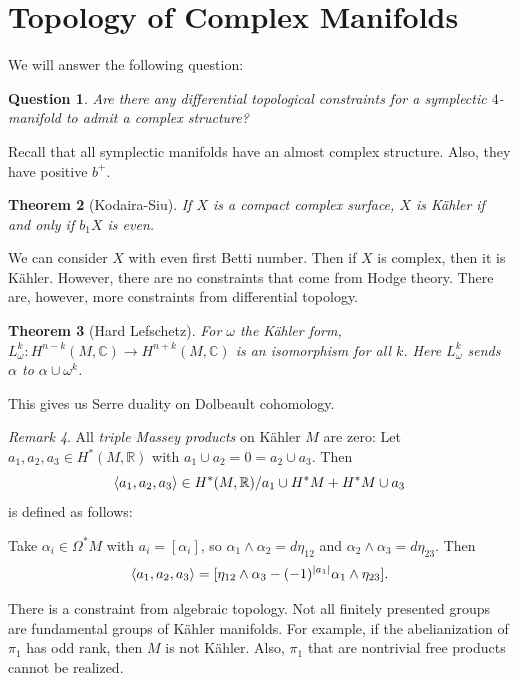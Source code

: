 \documentclass[leqno, openany]{memoir}
\DeclarePairedDelimiter{\gen}{\langle}{\rangle}
\newtheorem{thm}{Theorem}[chapter]
\newtheorem{quest}[thm]{Question}
\theoremstyle{definition}
\theoremstyle{remark}
\newtheorem{rmk}[thm]{Remark}
\theoremstyle{plain}
\theoremstyle{definition}
\theoremstyle{remark}
\newcommand{\R}{\mathbb{R}}
\newcommand{\C}{\mathbb{C}}
\begin{document}
\section{Topology of Complex Manifolds}%
\label{sec:topology_of_complex_manifolds}

We will answer the following question:
\begin{quest}
    Are there any differential topological constraints for a symplectic $4$-manifold to admit a complex structure?
\end{quest}

Recall that all symplectic manifolds have an almost complex structure. Also, they have positive $b^+$.

\begin{thm}[Kodaira-Siu]
    If $X$ is a compact complex surface, $X$ is K\"ahler if and only if $b_1 X$ is even.
\end{thm}

We can consider $X$ with even first Betti number. Then if $X$ is complex, then it is K\"ahler. However, there are no constraints that come from Hodge theory. There are, however, more constraints from differential topology.

\begin{thm}[Hard Lefschetz]
    For $\omega$ the K\"ahler form, $L_{\omega}^k: H^{n-k}(M, \C) \to H^{n+k}(M, \C)$ is an isomorphism for all $k$. Here $L_{\omega}^k$ sends $\alpha$ to $\alpha \cup \omega^k$.
\end{thm}

This gives us Serre duality on Dolbeault cohomology.

\begin{rmk}
    All \textit{triple Massey products} on K\"ahler $M$ are zero: Let $a_1, a_2, a_3 \in H^*(M, \R)$ with $a_1 \cup a_2 = 0 = a_2 \cup a_3$. Then 
    \[ \gen{a_1, a_2, a_3} \in H^*(M, \R)/ a_1 \cup H^*M + H^*M \cup a_3 \]
    is defined as follows:

    Take $\alpha_i \in \Omega^*M$ with $a_i = [\alpha_i]$, so $\alpha_1 \wedge \alpha_2 = d \eta_{12}$ and $\alpha_2 \wedge \alpha_3 = d\eta_{23}$. Then
    \[ \gen{a_1, a_2, a_3} = [\eta_{12} \wedge \alpha_3 - (-1)^{\abs{a_1}} \alpha_1 \wedge \eta_{23}]. \]
\end{rmk}

There is a constraint from algebraic topology. Not all finitely presented groups are fundamental groups of K\"ahler manifolds. For example, if the abelianization of $\pi_1$ has odd rank, then $M$ is not K\"ahler. Also, $\pi_1$ that are nontrivial free products cannot be realized.
\end{document}
